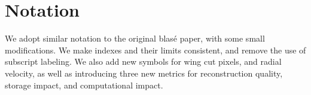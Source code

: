 \documentclass[twocolumn]{aastex631}
\begin{document}
\pagebreak
\newpage

\begin{acknowledgments}
    \blindtext
\end{acknowledgments}


\software{}


\clearpage

\appendix
\section{Notation}
We adopt similar notation to the original blas\'e paper, with some small modifications. We make indexes and
their limits consistent, and remove the use of subscript labeling. We also add new symbols for
wing cut pixels, and radial velocity, as well as introducing three new metrics for reconstruction quality,
storage impact, and computational impact.
\end{document}
